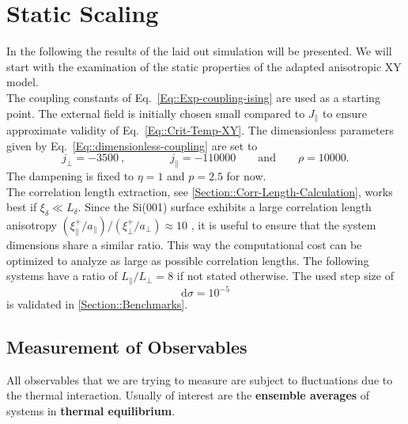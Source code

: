 	\section{Static Scaling}
	In the following the results of the laid out simulation will be presented. We will start with the examination of the static properties of the adapted anisotropic XY model. \\
	
	The coupling constants of Eq.~\eqref{Eq::Exp-coupling-ising} are used as a starting point.
	 The external field is initially chosen small compared to $J_\parallel$ to ensure approximate validity of Eq.~\eqref{Eq::Crit-Temp-XY}. The dimensionless parameters given by Eq.~\eqref{Eq::dimensionless-coupling} are set to
	\begin{equation} \label{Eq::standard-parameters}
		j_\perp =	-3500~, \qquad \qquad j_\parallel =	-110000 \qquad \text{and} \qquad \rho =	10000.
	\end{equation}
	The dampening is fixed to $\eta =	1$ and $p=2.5$ for now. \\
	
	The correlation length extraction, see \autoref{Section::Corr-Length-Calculation}, works best if $\xi_\delta \ll L_\delta$. Since the Si(001) surface exhibits a large correlation length anisotropy ${(\xi^+_\parallel /	a_\parallel)} /	{(\xi^+_\perp /	a_\perp)} \approx 10 $ \cite{brand2023critical}, it is useful to ensure that the system dimensions share a similar ratio. This way the computational cost can be optimized to analyze as large as possible correlation lengths. The following systems have a ratio of ${L_\parallel} /	{L_\perp} =	8$ if not stated otherwise. The used step size of
	\begin{equation}
		\text{d}\sigma = 10^{-5}
	\end{equation}
	is validated in \autoref{Section::Benchmarks}.
	
	
	
	\subsection{Measurement of Observables} \label{Section::observable-measurement}
	All observables that we are trying to measure are subject to fluctuations due to the thermal interaction. Usually of interest are the \textbf{ensemble averages} of systems in \textbf{thermal equilibrium}. \\
	
